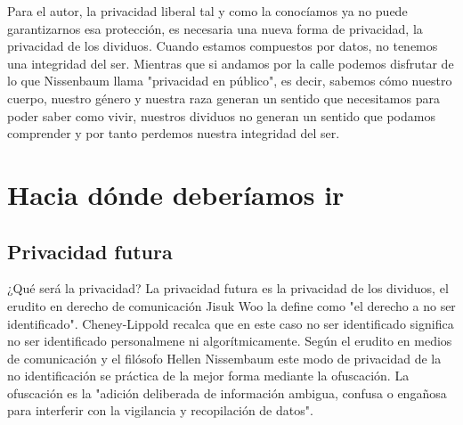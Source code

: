 \documentclass[11pt]{article}
\begin{document}
Para el autor, la privacidad liberal tal y como la conocíamos ya no puede garantizarnos esa protección, es necesaria una nueva forma de privacidad, la privacidad de los dividuos. Cuando estamos compuestos por datos, no tenemos una integridad del ser. Mientras que si andamos por la calle podemos disfrutar de lo que Nissenbaum llama "privacidad en público", es decir, sabemos cómo nuestro cuerpo, nuestro género y nuestra raza generan un sentido que necesitamos para poder saber como vivir, nuestros dividuos no generan un sentido que podamos comprender y por tanto perdemos nuestra integridad del ser.
\section{Hacia dónde deberíamos ir}
\subsection{Privacidad futura}
¿Qué será la privacidad? La privacidad futura es la privacidad de los dividuos, el erudito en derecho de comunicación Jisuk Woo la define como "el derecho a no ser identificado". Cheney-Lippold recalca que en este caso no ser identificado significa no ser identificado personalmene ni algorítmicamente. Según el erudito en medios de comunicación y el filósofo Hellen Nissembaum este modo de privacidad de la no identificación se práctica de la mejor forma mediante la ofuscación. La ofuscación es la "adición deliberada de información ambigua, confusa o engañosa para interferir con la vigilancia y recopilación de datos".
\end{document}
